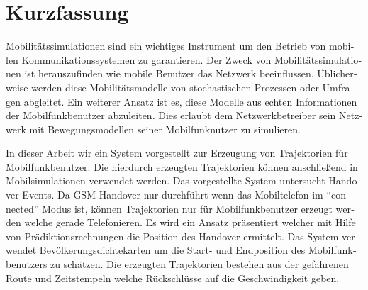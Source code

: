 
\chapter{Kurzfassung}
\begin{german}
Mobilitätssimulationen sind ein wichtiges Instrument um den Betrieb von mobilen Kommunikationssystemen zu garantieren. Der Zweck von Mobilitätssimulationen ist herauszufinden wie mobile Benutzer das Netzwerk beeinflussen. Üblicherweise werden diese Mobilitätsmodelle von stochastischen Prozessen oder Umfragen abgleitet. Ein weiterer Ansatz ist es, diese Modelle aus echten Informationen der Mobilfunkbenutzer abzuleiten. Dies erlaubt dem Netzwerkbetreiber sein Netzwerk mit Bewegungsmodellen seiner Mobilfunknutzer zu simulieren.

In dieser Arbeit wir ein System vorgestellt zur Erzeugung von Trajektorien für Mobilfunkbenutzer. Die hierdurch erzeugten Trajektorien können anschließend in Mobilsimulationen verwendet werden. Das vorgestellte System untersucht Handover Events. Da GSM Handover nur durchführt wenn das Mobiltelefon im "`connected"' Modus ist, können Trajektorien nur für Mobilfunkbenutzer erzeugt werden welche gerade Telefonieren. Es wird ein Ansatz präsentiert welcher mit Hilfe von Prädiktionsrechnungen die Position des Handover ermittelt. Das System verwendet Bevölkerungsdichtekarten um die Start- und Endposition des Mobilfunkbenutzers zu schätzen. Die erzeugten Trajektorien bestehen aus der gefahrenen Route und Zeitstempeln welche Rückschlüsse auf die Geschwindigkeit geben.
\end{german}